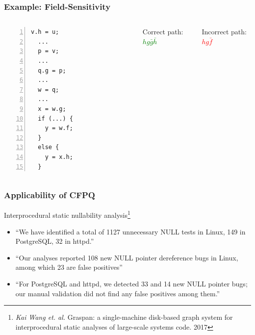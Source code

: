 \documentclass[xcolor=table]{beamer}
\begin{document}
\begin{frame}[fragile]
\frametitle{Example: Field-Sensitivity}
\begin{columns}[c] %

\begin{Verbatim}[numbers=left]
  v.h = u;
  ...
  p = v;
  ...
  q.g = p;
  ...
  w = q;
  ...
  x = w.g;
  if (...) {
    y = w.f;
  }
  else {
    y = x.h;
  }    
\end{Verbatim}

\begin{figure}[h]
    \centering        
\end{figure}
Correct path: \textcolor{green}{$hg\bar{g}\bar{h}$}

Incorrect path: \textcolor{red}{$hg\bar{f}$}

\end{columns}
\end{frame}


\begin{frame}
  \frametitle{Applicability of CFPQ}

 Interprocedural static nullability analysis\footnote{\emph{Kai Wang et. al.} Graspan: a single-machine disk-based graph system for interprocedural 
static analyses of large-scale systems code. 2017}
 
\bigskip

\begin{itemize} 
   \item ``We have identified a total of 1127 unnecessary NULL tests in Linux, 149 in PostgreSQL, 
   32 in httpd.''
   \item ``Our analyses reported 108 new NULL pointer dereference bugs in Linux, among which 23 are false positives''
   \item ``For PostgreSQL and httpd, we detected 33 and 14 new NULL pointer bugs; our manual 
   validation did not find any false positives among them.''
\end{itemize}


\end{frame}
\end{document}
